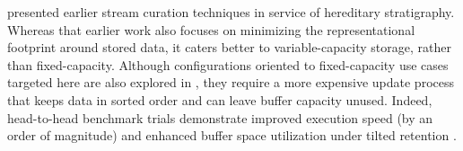 
\citet{moreno2024algorithms} presented earlier stream curation techniques in service of hereditary stratigraphy.
Whereas that earlier work also focuses on minimizing the representational footprint around stored data, it caters better to variable-capacity storage, rather than fixed-capacity.
Although configurations oriented to fixed-capacity use cases targeted here are also explored in \citet{moreno2024algorithms}, they require a more expensive update process that keeps data in sorted order and can leave buffer capacity unused.
Indeed, head-to-head benchmark trials demonstrate improved execution speed (by an order of magnitude) and enhanced buffer space utilization under tilted retention \citep{moreno2024guide,moreno2024trackable}.
